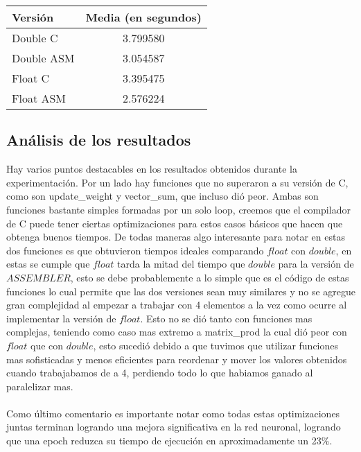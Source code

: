\begin{center}
    \begin{tabular}{| l | c |}
                \hline
    Versión & Media (en segundos) \\
                \hline
    Double C & 3.799580 \\
    Double ASM & 3.054587 \\
    Float C & 3.395475 \\
    Float ASM  & 2.576224 \\
                \hline
            
        \end{tabular}
\end{center}

\subsection{Análisis de los resultados}

Hay varios puntos destacables en los resultados obtenidos durante la experimentación. Por un lado hay funciones que no superaron a su versión de C, como son update\_weight y vector\_sum, que incluso dió peor. Ambas son funciones bastante simples formadas por un solo loop, creemos que el compilador de C puede tener ciertas optimizaciones para estos casos básicos que hacen que obtenga buenos tiempos. De todas maneras algo interesante para notar en estas dos funciones es que obtuvieron tiempos ideales comparando $float$ con $double$, en estas se cumple que $float$ tarda la mitad del tiempo que $double$ para la versión de $ASSEMBLER$, esto se debe probablemente a lo simple que es el código de estas funciones lo cual permite que las dos versiones sean muy similares y no se agregue gran complejidad al empezar a trabajar con 4 elementos a la vez como ocurre al implementar la versión de $float$. Esto no se dió tanto con funciones mas complejas, teniendo como caso mas extremo a matrix\_prod la cual dió peor con $float$ que con $double$, esto sucedió debido a que tuvimos que utilizar funciones mas sofisticadas y menos eficientes para reordenar y mover los valores obtenidos cuando trabajabamos de a 4, perdiendo todo lo que habiamos ganado al paralelizar mas.
\\
\\
Como último comentario es importante notar como todas estas optimizaciones juntas terminan logrando una mejora significativa en la red neuronal, logrando que una epoch reduzca su tiempo de ejecución en aproximadamente un 23\%.